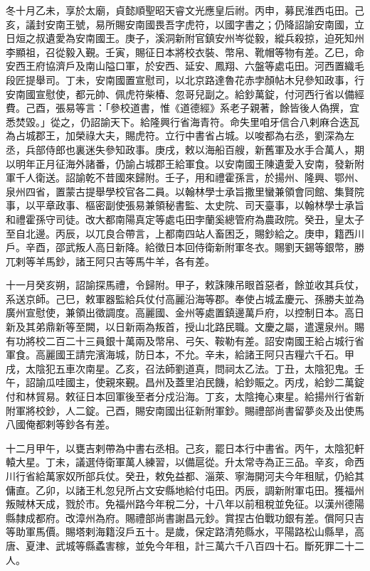 \begin{pinyinscope}
 冬十月乙未，享於太廟，貞懿順聖昭天睿文光應皇后祔。丙申，募民淮西屯田。己亥，議封安南王號，易所賜安南國畏吾字虎符，以國字書之；仍降詔諭安南國，立日烜之叔遺愛為安南國王。庚子，溪洞新附官鎮安州岑從毅，縱兵殺掠，迫死知州李顯祖，召從毅入覲。壬寅，賜征日本將校衣裝、幣帛、靴帽等物有差。乙巳，命安西王府協濟戶及南山隘口軍，於安西、延安、鳳翔、六盤等處屯田。河西置織毛段匠提舉司。丁未，安南國置宣慰司，以北京路達魯花赤孛顏帖木兒參知政事，行安南國宣慰使，都元帥、佩虎符柴椿、忽哥兒副之。給鈔萬錠，付河西行省以備經費。己酉，張易等言：「參校道書，惟《道德經》系老子親著，餘皆後人偽撰，宜悉焚毀。」從之，仍詔諭天下。給隆興行省海青符。命失里咱牙信合八剌麻合迭瓦為占城郡王，加榮祿大夫，賜虎符。立行中書省占城。以唆都為右丞，劉深為左丞，兵部侍郎也裏迷失參知政事。庚戌，敕以海船百艘，新舊軍及水手合萬人，期以明年正月征海外諸番，仍諭占城郡王給軍食。以安南國王陳遺愛入安南，發新附軍千人衛送。詔諭乾不昔國來歸附。壬子，用和禮霍孫言，於揚州、隆興、鄂州、泉州四省，置蒙古提舉學校官各二員。以翰林學士承旨撒里蠻兼領會同館、集賢院事，以平章政事、樞密副使張易兼領秘書監、太史院、司天臺事，以翰林學士承旨和禮霍孫守司徒。改大都南陽真定等處屯田孛蘭奚總管府為農政院。癸丑，皇太子至自北邊。丙辰，以兀良合帶言，上都南四站人畜困乏，賜鈔給之。庚申，籍西川戶。辛酉，邵武叛人高日新降。給徵日本回侍衛新附軍冬衣。賜劉天錫等銀幣，勝兀剌等羊馬鈔，諸王阿只吉等馬牛羊，各有差。



 十一月癸亥朔，詔諭探馬禮，令歸附。甲子，敕誅陳吊眼首惡者，餘並收其兵仗，系送京師。己巳，敕軍器監給兵仗付高麗沿海等郡。奉使占城孟慶元、孫勝夫並為廣州宣慰使，兼領出徵調度。高麗國、金州等處置鎮邊萬戶府，以控制日本。高日新及其弟鼎新等至闕，以日新兩為叛首，授山北路民職。文慶之屬，遣還泉州。賜有功將校二百二十三員銀十萬兩及幣帛、弓矢、鞍勒有差。詔安南國王給占城行省軍食。高麗國王請完濱海城，防日本，不允。辛未，給諸王阿只吉糧六千石。甲戌，太陰犯五車次南星。乙亥，召法師劉道真，問祠太乙法。丁丑，太陰犯鬼。壬午，詔諭瓜哇國主，使親來覲。昌州及蓋里泊民饑，給鈔賑之。丙戌，給鈔二萬錠付和林貿易。敕征日本回軍後至者分戍沿海。丁亥，太陰掩心東星。給揚州行省新附軍將校鈔，人二錠。己酉，賜安南國出征新附軍鈔。賜禮部尚書留夢炎及出使馬八國俺都剌等鈔各有差。



 十二月甲午，以甕吉剌帶為中書右丞相。己亥，罷日本行中書省。丙午，太陰犯軒轅大星。丁未，議選侍衛軍萬人練習，以備扈從。升太常寺為正三品。辛亥，命西川行省給萬家奴所部兵仗。癸丑，敕免益都、淄萊、寧海開河夫今年租賦，仍給其傭直。乙卯，以諸王札忽兒所占文安縣地給付屯田。丙辰，調新附軍屯田。獲福州叛賊林天成，戮於市。免福州路今年稅二分，十八年以前租稅並免征。以漢州德陽縣隸成都府。改漳州為府。賜禮部尚書謝昌元鈔。賞捏古伯戰功銀有差。償阿只吉等助軍馬價。賜塔剌海籍沒戶五十。是歲，保定路清苑縣水，平陽路松山縣旱，高唐、夏津、武城等縣蟊害稼，並免今年租，計三萬六千八百四十石。斷死罪二十二人。



\end{pinyinscope}